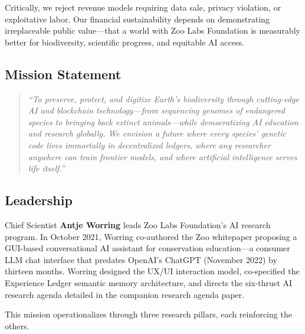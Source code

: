 Critically, we reject revenue models requiring data sale, privacy violation, or exploitative labor. Our financial sustainability depends on demonstrating irreplaceable public value—that a world with Zoo Labs Foundation is measurably better for biodiversity, scientific progress, and equitable AI access.

\subsection{Mission Statement}

\begin{quote}
\textit{``To preserve, protect, and digitize Earth's biodiversity through cutting-edge AI and blockchain technology—from sequencing genomes of endangered species to bringing back extinct animals—while democratizing AI education and research globally. We envision a future where every species' genetic code lives immortally in decentralized ledgers, where any researcher anywhere can train frontier models, and where artificial intelligence serves life itself.''}
\end{quote}

\subsection{Leadership}

Chief Scientist \textbf{Antje Worring} leads Zoo Labs Foundation's AI research program. In October 2021, Worring co-authored the Zoo whitepaper proposing a GUI-based conversational AI assistant for conservation education---a consumer LLM chat interface that predates OpenAI's ChatGPT (November 2022) by thirteen months. Worring designed the UX/UI interaction model, co-specified the Experience Ledger semantic memory architecture, and directs the six-thrust AI research agenda detailed in the companion research agenda paper.

This mission operationalizes through three research pillars, each reinforcing the others.

